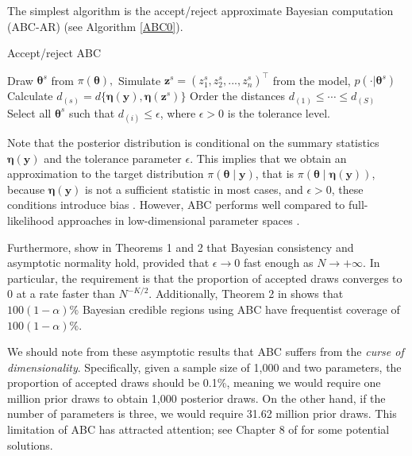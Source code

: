 The simplest algorithm is the accept/reject approximate Bayesian computation (ABC-AR) (see Algorithm \ref{ABC0}).

\begin{algorithm}
	\caption{Accept/reject ABC}\label{ABC0}
	\begin{algorithmic}[1]
		\State Draw ${\boldsymbol {\theta} }^{s}$ from $\pi({ \boldsymbol{\theta} }),$
		\State Simulate ${\boldsymbol z}^{s}=(z_{1}^{s},z_{2}^{s},...,z_{n}^{s})^{\top}$ from the model, $p(\cdot|{\boldsymbol{\theta} }^{s})$
		\State Calculate
		$d_{(s)}=d\{{\boldsymbol\eta }({\boldsymbol y}),{\boldsymbol \eta }({\boldsymbol z}^{s})\}$
		\EndFor
		\State Order the distances $d_{(1)}\leq\cdots\leq d_{(S)}$
		\State Select all $\boldsymbol{\theta}^s$ such that $d_{(i)}\leq \epsilon$, where $\epsilon>0$ is the tolerance level. 
	\end{algorithmic}
\end{algorithm}

Note that the posterior distribution is conditional on the summary statistics \( \boldsymbol{\eta}(\boldsymbol{y}) \) and the tolerance parameter \( \epsilon \). This implies that we obtain an approximation to the target distribution \( \pi(\boldsymbol{\theta} \mid \boldsymbol{y}) \), that is \( \pi(\boldsymbol{\theta} \mid \boldsymbol{\eta}(\boldsymbol{y})) \), because \( \boldsymbol{\eta}(\boldsymbol{y}) \) is not a sufficient statistic in most cases, and \( \epsilon > 0 \), these conditions introduce bias \cite{blum2010approximate}. However, ABC performs well compared to full-likelihood approaches in low-dimensional parameter spaces \cite{beaumont2002approximate}.

Furthermore, \cite{frazier2018asymptotic} show in Theorems 1 and 2 that Bayesian consistency and asymptotic normality hold, provided that \( \epsilon \to 0 \) fast enough as \( N \to +\infty \). In particular, the requirement is that the proportion of accepted draws converges to 0 at a rate faster than \( N^{-K / 2} \). Additionally, Theorem 2 in \cite{frazier2018asymptotic} shows that \( 100(1 -\alpha)\% \) Bayesian credible regions using ABC have frequentist coverage of \( 100(1 -\alpha)\% \). 

We should note from these asymptotic results that ABC suffers from the \textit{curse of dimensionality}. Specifically, given a sample size of 1,000 and two parameters, the proportion of accepted draws should be 0.1\%, meaning we would require one million prior draws to obtain 1,000 posterior draws. On the other hand, if the number of parameters is three, we would require 31.62 million prior draws. This limitation of ABC has attracted attention; see Chapter 8 of \cite{sisson2018handbook} for some potential solutions.

